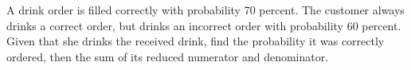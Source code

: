 A drink order is filled correctly with probability 70 percent. The customer always drinks a correct order, but drinks an incorrect order with probability 60 percent. Given that she drinks the received drink, find the probability it was correctly ordered, then the sum of its reduced numerator and denominator.
